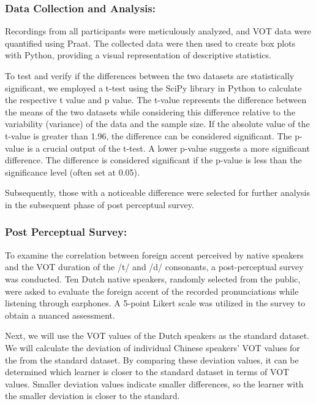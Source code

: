 \documentclass[runningheads]{llncs}
\begin{document}
\subsubsection*{Data Collection and Analysis:}
Recordings from all participants were meticulously analyzed, and VOT data were quantified using Praat. The collected data were then used to create box plots with Python, providing a visual representation of descriptive statistics. \cite{cho_phonological_2006}

To test and verify if the differences between the two datasets are statistically significant, we employed a t-test using the SciPy library in Python to calculate the respective t value and p value. The t-value represents the difference between the means of the two datasets while considering this difference relative to the variability (variance) of the data and the sample size. If the absolute value of the t-value is greater than 1.96, the difference can be considered significant. The p-value is a crucial output of the t-test. A lower p-value suggests a more significant difference. The difference is considered significant if the p-value is less than the significance level (often set at 0.05).
 
Subsequently, those with a noticeable difference were selected for further analysis in the subsequent phase of post perceptual survey.

\subsubsection*{Post Perceptual Survey:}
To examine the correlation between foreign accent perceived by native speakers and the VOT duration of the /t/ and /d/ consonants, a post-perceptual survey was conducted. Ten Dutch native speakers, randomly selected from the public, were asked to evaluate the foreign accent of the recorded pronunciations while listening through earphones. A 5-point Likert scale was utilized in the survey to obtain a nuanced assessment.

Next, we will use the VOT values of the Dutch speakers as the standard dataset. We will calculate the deviation of individual Chinese speakers' VOT values for the from the standard dataset. By comparing these deviation values, it can be determined which learner  is closer to the standard dataset in terms of VOT values. Smaller deviation values indicate smaller differences, so the learner with the smaller deviation is closer to the standard.\cite{van_alphen_acoustical_2004}
\end{document}
